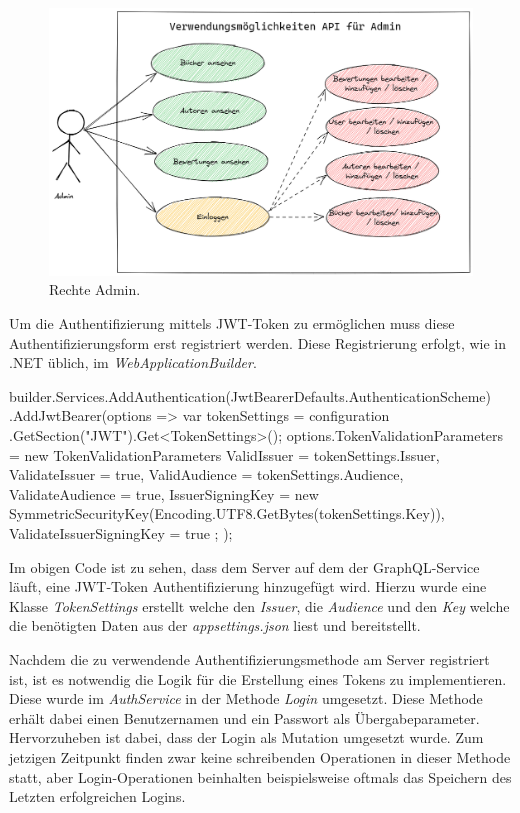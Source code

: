 \begin{figure}[H]
    \includegraphics[width=\textwidth]{pics/UseCaseAdmin.png}
    \caption{Rechte Admin.}
\end{figure}

Um die Authentifizierung mittels JWT-Token zu ermöglichen muss diese Authentifizierungsform erst registriert werden.
Diese Registrierung erfolgt, wie in .NET üblich, im \textit{WebApplicationBuilder}.

\begin{JsCode}
builder.Services.AddAuthentication(JwtBearerDefaults.AuthenticationScheme)
    .AddJwtBearer(options => {
        var tokenSettings = configuration
        .GetSection("JWT").Get<TokenSettings>();
        options.TokenValidationParameters = new TokenValidationParameters {
            ValidIssuer = tokenSettings.Issuer,
            ValidateIssuer = true,
            ValidAudience = tokenSettings.Audience,
            ValidateAudience = true,
            IssuerSigningKey = new SymmetricSecurityKey(Encoding.UTF8.GetBytes(tokenSettings.Key)),
            ValidateIssuerSigningKey = true
        };
    });
\end{JsCode}

Im obigen Code ist zu sehen, dass dem Server auf dem der GraphQL-Service läuft, eine JWT-Token Authentifizierung hinzugefügt wird.
Hierzu wurde eine Klasse \textit{TokenSettings} erstellt welche den \textit{Issuer}, die \textit{Audience} und den \textit{Key} welche die benötigten Daten aus der \textit{appsettings.json} liest und bereitstellt.
\newline

Nachdem die zu verwendende Authentifizierungsmethode am Server registriert ist, ist es notwendig die Logik für die Erstellung eines Tokens zu implementieren.
Diese wurde im \textit{AuthService} in der Methode \textit{Login} umgesetzt.
Diese Methode erhält dabei einen Benutzernamen und ein Passwort als Übergabeparameter.
Hervorzuheben ist dabei, dass der Login als Mutation umgesetzt wurde.
Zum jetzigen Zeitpunkt finden zwar keine schreibenden Operationen in dieser Methode statt, aber Login-Operationen beinhalten beispielsweise oftmals das Speichern des Letzten erfolgreichen Logins.
\newline

